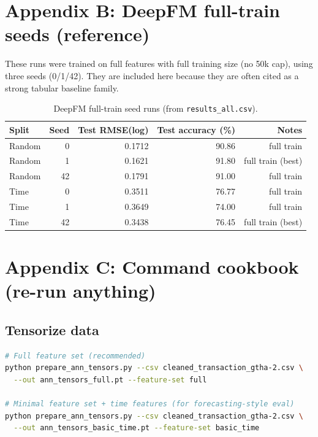 \documentclass[11pt]{article}
\begin{document}
\section{Appendix B: DeepFM full-train seeds (reference)}
These runs were trained on full features with full training size (no 50k cap), using three seeds (0/1/42). They are included here because they are often cited as a strong tabular baseline family.

\begin{table}[h]
\centering
\begin{tabular}{@{}lrrrr@{}}
\toprule
Split & Seed & Test RMSE(log) & Test accuracy (\%) & Notes \\
\midrule
Random & 0  & 0.1712 & 90.86 & full train \\
Random & 1  & 0.1621 & 91.80 & full train (best) \\
Random & 42 & 0.1791 & 91.00 & full train \\
\addlinespace
Time & 0  & 0.3511 & 76.77 & full train \\
Time & 1  & 0.3649 & 74.00 & full train \\
Time & 42 & 0.3438 & 76.45 & full train (best) \\
\bottomrule
\end{tabular}
\caption{DeepFM full-train seed runs (from \texttt{results\_all.csv}).}
\label{tab:deepfm-seeds}
\end{table}

\section{Appendix C: Command cookbook (re-run anything)}
\subsection{Tensorize data}
\begin{lstlisting}[language=bash]
# Full feature set (recommended)
python prepare_ann_tensors.py --csv cleaned_transaction_gtha-2.csv \
  --out ann_tensors_full.pt --feature-set full

# Minimal feature set + time features (for forecasting-style eval)
python prepare_ann_tensors.py --csv cleaned_transaction_gtha-2.csv \
  --out ann_tensors_basic_time.pt --feature-set basic_time
\end{lstlisting}
\end{document}
